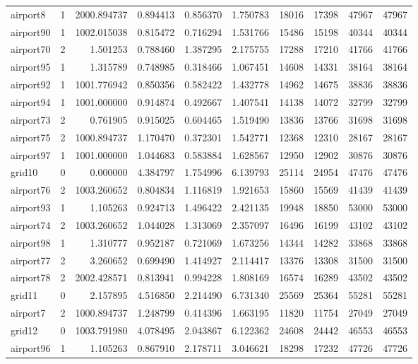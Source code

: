 \begin{longtable}{|l|r|r|r|r|r|r|r|r|r|}
airport8 & 1 & 2000.894737 & 0.894413 & 0.856370 & 1.750783 & 18016 & 17398 & 47967 & 47967 \\
airport90 & 1 & 1002.015038 & 0.815472 & 0.716294 & 1.531766 & 15486 & 15198 & 40344 & 40344 \\
airport70 & 2 & 1.501253 & 0.788460 & 1.387295 & 2.175755 & 17288 & 17210 & 41766 & 41766 \\
airport95 & 1 & 1.315789 & 0.748985 & 0.318466 & 1.067451 & 14608 & 14331 & 38164 & 38164 \\
airport92 & 1 & 1001.776942 & 0.850356 & 0.582422 & 1.432778 & 14962 & 14675 & 38836 & 38836 \\
airport94 & 1 & 1001.000000 & 0.914874 & 0.492667 & 1.407541 & 14138 & 14072 & 32799 & 32799 \\
airport73 & 2 & 0.761905 & 0.915025 & 0.604465 & 1.519490 & 13836 & 13766 & 31698 & 31698 \\
airport75 & 2 & 1000.894737 & 1.170470 & 0.372301 & 1.542771 & 12368 & 12310 & 28167 & 28167 \\
airport97 & 1 & 1001.000000 & 1.044683 & 0.583884 & 1.628567 & 12950 & 12902 & 30876 & 30876 \\
grid10 & 0 & 0.000000 & 4.384797 & 1.754996 & 6.139793 & 25114 & 24954 & 47476 & 47476 \\
airport76 & 2 & 1003.260652 & 0.804834 & 1.116819 & 1.921653 & 15860 & 15569 & 41439 & 41439 \\
airport93 & 1 & 1.105263 & 0.924713 & 1.496422 & 2.421135 & 19948 & 18850 & 53000 & 53000 \\
airport74 & 2 & 1003.260652 & 1.044028 & 1.313069 & 2.357097 & 16496 & 16199 & 43102 & 43102 \\
airport98 & 1 & 1.310777 & 0.952187 & 0.721069 & 1.673256 & 14344 & 14282 & 33868 & 33868 \\
airport77 & 2 & 3.260652 & 0.699490 & 1.414927 & 2.114417 & 13376 & 13308 & 31500 & 31500 \\
airport78 & 2 & 2002.428571 & 0.813941 & 0.994228 & 1.808169 & 16574 & 16289 & 43502 & 43502 \\
grid11 & 0 & 2.157895 & 4.516850 & 2.214490 & 6.731340 & 25569 & 25364 & 55281 & 55281 \\
airport7 & 2 & 1000.894737 & 1.248799 & 0.414396 & 1.663195 & 11820 & 11754 & 27049 & 27049 \\
grid12 & 0 & 1003.791980 & 4.078495 & 2.043867 & 6.122362 & 24608 & 24442 & 46553 & 46553 \\
airport96 & 1 & 1.105263 & 0.867910 & 2.178711 & 3.046621 & 18298 & 17232 & 47726 & 47726 \\

\end{longtable}

